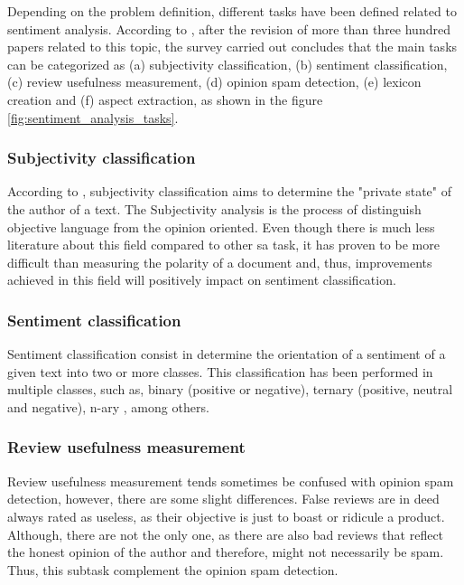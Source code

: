 Depending on the problem definition, different tasks have been defined related to sentiment analysis. According to \cite{ravi2015survey}, after the revision of more than three hundred papers related to this topic, the survey carried out concludes that the main tasks can be categorized as (a) subjectivity classification, (b) sentiment classification, (c) review usefulness measurement, (d) opinion spam detection, (e) lexicon creation and (f) aspect extraction, as shown in the figure \ref{fig:sentiment_analysis_tasks}. 

\subsubsection{Subjectivity classification}
\label{subsubsection:subject_classification}

According to \cite{montoyo2012subjectivity}, subjectivity classification aims to determine the "private state" of the author of a text. The Subjectivity analysis is the process of distinguish objective language from the opinion oriented. Even though there is much less literature about this field compared to other \acrshort{sa} task, it has proven to be more difficult than measuring the polarity of a document and, thus, improvements achieved in this field will positively impact on sentiment classification.

\subsubsection{Sentiment classification}
\label{subsubsection:sentiment_classification}

Sentiment classification consist in determine the orientation of a sentiment of a given text into two or more classes. This classification has been performed in multiple classes, such as, binary (positive or negative), ternary (positive, neutral and negative), n-ary \cite{nakov2016semeval}, among others.

\subsubsection{Review usefulness measurement}
\label{subsubsection:review_usefulness_measurement}

Review usefulness measurement tends sometimes be confused with opinion spam detection, however, there are some slight differences. False reviews are in deed always rated as useless, as their objective is just to boast or ridicule a product. Although, there are not the only one, as there are also bad reviews that reflect the honest opinion of the author and therefore, might not necessarily be spam. Thus, this subtask complement the opinion spam detection.


